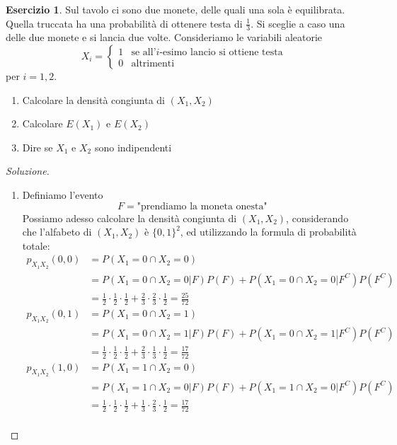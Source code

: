 \documentclass{article}
\theoremstyle{plain}
\theoremstyle{definition}
\newtheorem{esercizio}{Esercizio}[section]
\theoremstyle{remark}
\newenvironment{soluzione}
	{\renewcommand\qedsymbol{$\mathwitch*$}\begin{proof}[Soluzione]}
	{\end{proof}}
\renewcommand{\qedsymbol}{$\mathrightghost$}
\begin{document}
\begin{esercizio}
	Sul tavolo ci sono due monete, delle quali una sola è equilibrata. Quella truccata ha una probabilità di ottenere testa di $\frac{1}{3}$. Si sceglie a caso una delle due monete e si lancia due volte. Consideriamo le variabili aleatorie
	\begin{equation*}
		X_i=
		\begin{cases}
			1&\text{se all'}i\text{-esimo lancio si ottiene testa}\\
			0&\text{altrimenti}
		\end{cases}
	\end{equation*}
	per $i=1,2$.
	\begin{enumerate}
		\item Calcolare la densità congiunta di $(X_1,X_2)$
		\item Calcolare $E(X_1)$ e $E(X_2)$
		\item Dire se $X_1$ e $X_2$ sono indipendenti
	\end{enumerate}
	\begin{soluzione}
		\begin{enumerate}
			\item Definiamo l'evento
			\begin{equation*}
				F=\text{"prendiamo la moneta onesta"}
			\end{equation*}
			Possiamo adesso calcolare la densità congiunta di $(X_1,X_2)$, considerando che l'alfabeto di $(X_1,X_2)$ è $\{0,1\}^2$, ed utilizzando la formula di probabilità totale:
			\begin{align*}
				p_{X_1X_2}(0,0)&=P(X_1=0\cap X_2=0)\\
				&=P(X_1=0\cap X_2=0|F)P(F)+P(X_1=0\cap X_2=0|F^C)P(F^C)\\
				&=\frac{1}{2}\cdot\frac{1}{2}\cdot\frac{1}{2}+\frac{2}{3}\cdot\frac{2}{3}\cdot\frac{1}{2}=\frac{25}{72}\\
				p_{X_1X_2}(0,1)&=P(X_1=0\cap X_2=1)\\
				&=P(X_1=0\cap X_2=1|F)P(F)+P(X_1=0\cap X_2=1|F^C)P(F^C)\\
				&=\frac{1}{2}\cdot\frac{1}{2}\cdot\frac{1}{2}+\frac{2}{3}\cdot\frac{1}{3}\cdot\frac{1}{2}=\frac{17}{72}\\
				p_{X_1X_2}(1,0)&=P(X_1=1\cap X_2=0)\\
				&=P(X_1=1\cap X_2=0|F)P(F)+P(X_1=1\cap X_2=0|F^C)P(F^C)\\
				&=\frac{1}{2}\cdot\frac{1}{2}\cdot\frac{1}{2}+\frac{1}{3}\cdot\frac{2}{3}\cdot\frac{1}{2}=\frac{17}{72}\\

\end{align*}
\end{enumerate}
\end{soluzione}
\end{esercizio}
\end{document}
